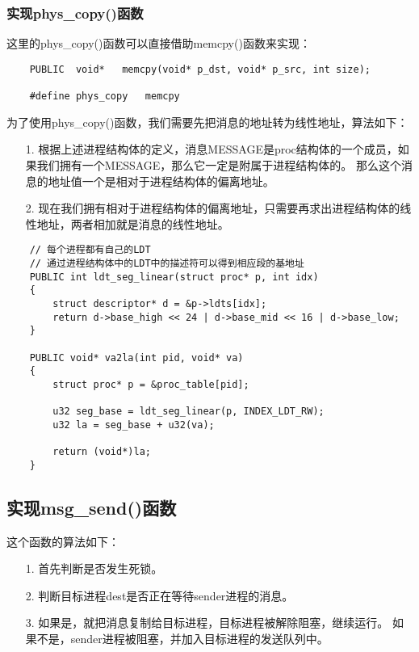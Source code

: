 \documentclass[a4paper,left=2.5cm,right=2.5cm,11pt]{article}
\begin{document}
\subsubsection{实现phys\_copy()函数}
	这里的phys\_copy()函数可以直接借助memcpy()函数来实现：
	\begin{lstlisting}
	PUBLIC	void*	memcpy(void* p_dst, void* p_src, int size);
	
	#define	phys_copy	memcpy
	\end{lstlisting}

	为了使用phys\_copy()函数，我们需要先把消息的地址转为线性地址，算法如下：
	\begin{itemize}
		\item[1.] 根据上述进程结构体的定义，消息MESSAGE是proc结构体的一个成员，如果我们拥有一个MESSAGE，那么它一定是附属于进程结构体的。
		          那么这个消息的地址值一个是相对于进程结构体的偏离地址。
		\item[2.] 现在我们拥有相对于进程结构体的偏离地址，只需要再求出进程结构体的线性地址，两者相加就是消息的线性地址。
	\end{itemize}
	\begin{lstlisting}
	// 每个进程都有自己的LDT
	// 通过进程结构体中的LDT中的描述符可以得到相应段的基地址
	PUBLIC int ldt_seg_linear(struct proc* p, int idx)
	{
		struct descriptor* d = &p->ldts[idx];
		return d->base_high << 24 | d->base_mid << 16 | d->base_low;
	}

	PUBLIC void* va2la(int pid, void* va)
	{
		struct proc* p = &proc_table[pid];

		u32 seg_base = ldt_seg_linear(p, INDEX_LDT_RW);
		u32 la = seg_base + u32(va);

		return (void*)la;
	}
	\end{lstlisting}

\subsection{实现msg\_send()函数}
	这个函数的算法如下：
	\begin{itemize}
		\item[1.] 首先判断是否发生死锁。
		\item[2.] 判断目标进程dest是否正在等待sender进程的消息。
		\item[3.] 如果是，就把消息复制给目标进程，目标进程被解除阻塞，继续运行。
				  如果不是，sender进程被阻塞，并加入目标进程的发送队列中。
	\end{itemize}
\end{document}
